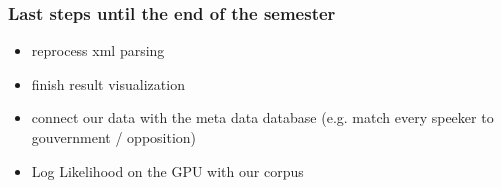 \documentclass[11pt, a4paper]{beamer}
\begin{document}
\begin{frame}
\frametitle{Last steps until the end of the semester}
\begin{itemize}
	\item reprocess xml parsing
	\item finish result visualization
	\item connect our data with the meta data database (e.g. match every speeker to gouvernment / opposition)
	\item Log Likelihood on the GPU with our corpus
\end{itemize}
\end{frame}

\printbibliography
\end{document}
